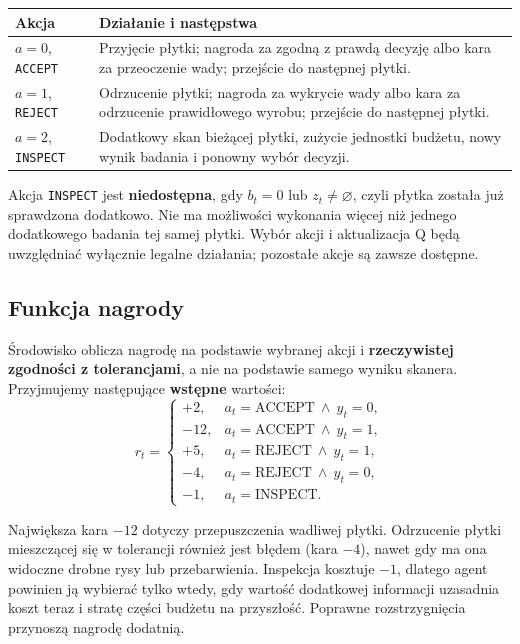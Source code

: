 \documentclass[12pt]{article}
\begin{document}
\begin{center}
\renewcommand{\arraystretch}{1.22}
\begin{tabular}{p{}p{}}
\toprule
Akcja & Działanie i następstwa \\
\midrule
\(a=0\), \texttt{ACCEPT} & Przyjęcie płytki; nagroda za zgodną z prawdą decyzję albo kara za przeoczenie wady; przejście do następnej płytki. \\
\(a=1\), \texttt{REJECT} & Odrzucenie płytki; nagroda za wykrycie wady albo kara za odrzucenie prawidłowego wyrobu; przejście do następnej płytki. \\
\(a=2\), \texttt{INSPECT} & Dodatkowy skan bieżącej płytki, zużycie jednostki budżetu, nowy wynik badania i ponowny wybór decyzji. \\
\bottomrule
\end{tabular}
\end{center}

Akcja \texttt{INSPECT} jest \textbf{niedostępna}, gdy \(b_t=0\) lub \(z_t\neq\varnothing\), czyli płytka została już sprawdzona dodatkowo. Nie ma możliwości wykonania więcej niż jednego dodatkowego badania tej samej płytki. Wybór akcji i aktualizacja Q będą uwzględniać wyłącznie legalne działania; pozostałe akcje są zawsze dostępne.

\subsection{Funkcja nagrody}

Środowisko oblicza nagrodę na podstawie wybranej akcji i \textbf{rzeczywistej zgodności z tolerancjami}, a nie na podstawie samego wyniku skanera. Przyjmujemy następujące \textbf{wstępne} wartości:
\begin{equation}
 r_t=\begin{cases}
 +2, & a_t=\mathrm{ACCEPT}\ \land\ y_t=0,\\
 -12, & a_t=\mathrm{ACCEPT}\ \land\ y_t=1,\\
 +5, & a_t=\mathrm{REJECT}\ \land\ y_t=1,\\
 -4, & a_t=\mathrm{REJECT}\ \land\ y_t=0,\\
 -1, & a_t=\mathrm{INSPECT}.
 \end{cases}
\end{equation}

Największa kara \(-12\) dotyczy przepuszczenia wadliwej płytki. Odrzucenie płytki mieszczącej się w tolerancji również jest błędem (kara \(-4\)), nawet gdy ma ona widoczne drobne rysy lub przebarwienia. Inspekcja kosztuje \(-1\), dlatego agent powinien ją wybierać tylko wtedy, gdy wartość dodatkowej informacji uzasadnia koszt teraz i stratę części budżetu na przyszłość. Poprawne rozstrzygnięcia przynoszą nagrodę dodatnią.
\end{document}
